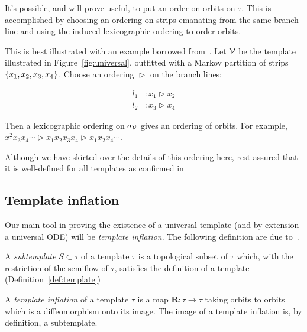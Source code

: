 \documentclass[paper.tex]{subfiles}
\begin{document}
It's possible, and will prove useful, to put an order on orbits on $\tau$. This is accomplished by choosing an ordering on strips emanating from the same branch line and using the induced lexicographic ordering to
order orbits.

This is best illustrated with an example borrowed from~\cite{knottyode}. Let $\mathcal{V}$ be the template illustrated in Figure~\ref{fig:universal}, outfitted with a Markov partition of strips $\{ x_1, x_2, x_3, x_4 \}$.
Choose an ordering $\vartriangleright$ on the branch lines:

\begin{align}
  l_1 &: x_1 \vartriangleright x_2 \\
  l_2 &: x_3 \vartriangleright x_4
\end{align}

Then a lexicographic ordering on $\sigma_{\mathcal{V}}$ gives an ordering of orbits. For example, $x_1^2 x_3 x_4 \cdots \vartriangleright x_1 x_2 x_3 x_4 \vartriangleright x_1 x_2 x_4 \cdots$.

Although we have skirted over the details of this ordering here, rest assured that it is well-defined for all templates as confirmed in~\cite{Holmes1989}\cite{Holmes1985}\cite{knottyode}


\subsection{Template inflation}

Our main tool in proving the existence of a universal template (and by extension a universal ODE) will be \emph{template inflation}. The following definition are due to~\cite{knottyode}.





\begin{definition}[Subtemplate]
  A \emph{subtemplate} $S \subset \tau$ of a template $\tau$ is a topological subset of $\tau$ which, with the restriction of the semiflow of $\tau$, satisfies the definition of a template (Definition~\ref{def:template})
\end{definition}


\begin{definition}
  A  \emph{template inflation} of a template $\tau$ is a map $\bm{R} : \tau \to \tau$ taking orbits to orbits which is a diffeomorphism onto its image.
  The image of a template inflation is, by definition, a subtemplate.
\end{definition}
\end{document}
